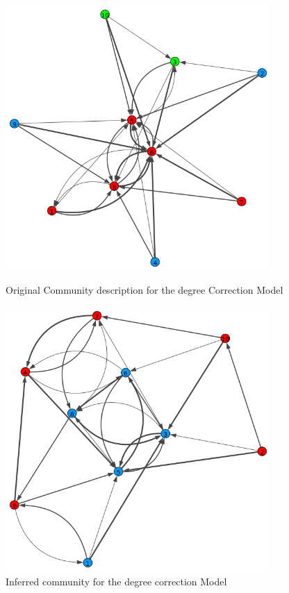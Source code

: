 \documentclass[12pt]{ociamthesis}  %
\begin{document}
	\begin{figure}[H]
		\centering
		\begin{minipage}{0.45\textwidth}
			\centering
			\includegraphics[width=0.9\textwidth]{OriginalPlotDegreeCorrection} %
			\caption{Original Community description for the degree Correction Model}
			\label{label-image5}
		\end{minipage}\hfill
		\begin{minipage}{0.45\textwidth}
			\centering
			\includegraphics[width=0.9\textwidth]{OptimizationPlotDegreeCorrection} %
			\caption{Inferred community for the degree correction Model}
			\label{label-image6}
		\end{minipage}
	\end{figure}
	
\end{document}
